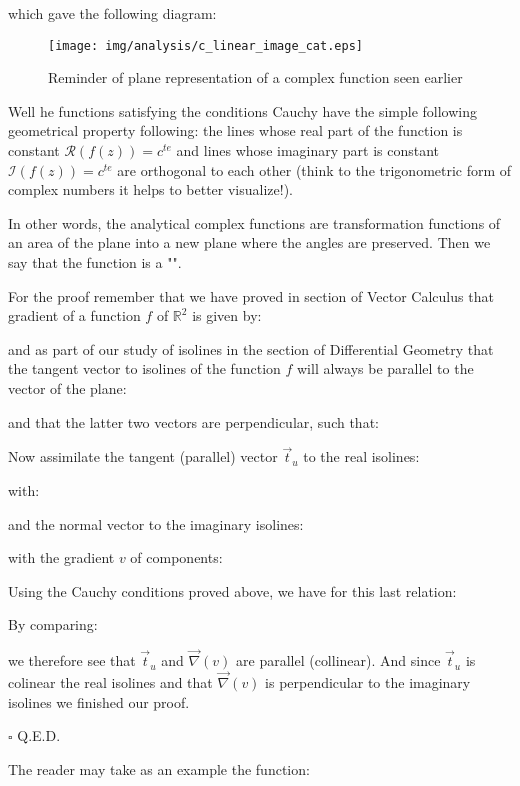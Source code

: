 	which gave the following diagram:
	\begin{figure}[H]
		\begin{center}
			\texttt{[image: img/analysis/c\_linear\_image\_cat.eps]}
		\end{center}	
		\caption{Reminder of plane representation of a complex function seen earlier}
	\end{figure}
	
	\begin{theorem}
	Well he functions satisfying the conditions Cauchy have the simple following geometrical property following: the lines whose real part of the function is constant $\mathcal{R}(f(z))=c^{te}$ and lines whose imaginary part is constant $\mathcal{I}(f(z))=c^{te}$  are orthogonal to each other (think to the trigonometric form of complex numbers it helps to better visualize!).
	
	In other words, the analytical complex functions are transformation functions of an area of the plane into a new plane where the angles are preserved. Then we say that the function is a "".
	\end{theorem}
	
	\begin{dem}
	For the proof remember that we have proved in section of Vector Calculus that  gradient of a function $f$ of $\mathbb{R}^2$ is given by:
	
	and as part of our study of isolines in the section of Differential Geometry that the tangent vector to isolines of the function $f$ will always be parallel to the vector of the plane:
	
	and that the latter two vectors are perpendicular, such that:
	
	Now assimilate the tangent (parallel) vector $\vec{t}_u$ to the real isolines:
	
	with:
	
	and the normal vector to the imaginary isolines:
	
	with the gradient $v$ of components:
	
	Using the Cauchy conditions proved above, we have for this last relation:
	
	By comparing:
	
	we therefore see that $\vec{t}_u$ and $\vec{\nabla}(v)$ are parallel (collinear). And since $\vec{t}_u$ is colinear the real isolines and that $\vec{\nabla}(v)$  is perpendicular to the imaginary isolines we finished our proof.
	\begin{flushright}
		$\square$  Q.E.D.
	\end{flushright}
	\end{dem}
	The reader may take as an example the function:
	
